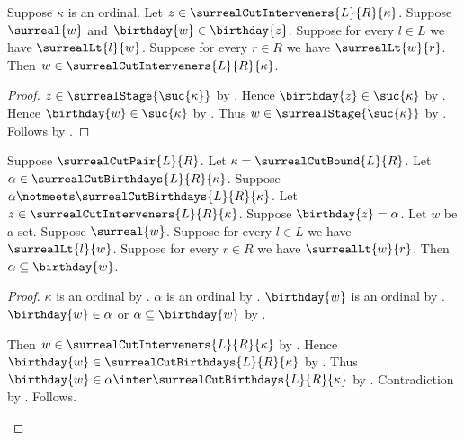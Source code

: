 \begin{lemma}\label{surreal_shorter_intervener_in_bound}
    Suppose $\kappa$ is an ordinal.
    Let $z\in\surrealCutInterveners{L}{R}{\kappa}$.
    Suppose $\surreal{w}$ and
        $\birthday{w}\in\birthday{z}$.
    Suppose for every $l\in L$ we have $\surrealLt{l}{w}$.
    Suppose for every $r\in R$ we have $\surrealLt{w}{r}$.
    Then $w\in\surrealCutInterveners{L}{R}{\kappa}$.
\end{lemma}
\begin{proof}
    $z\in\surrealStage{\suc{\kappa}}$
        by .
    Hence $\birthday{z}\in\suc{\kappa}$
        by .
    Hence $\birthday{w}\in\suc{\kappa}$
        by .
    Thus $w\in\surrealStage{\suc{\kappa}}$
        by .
    Follows by .
\end{proof}

\begin{lemma}\label{surreal_minimal_intervener_birthday}
    Suppose $\surrealCutPair{L}{R}$.
    Let $\kappa=\surrealCutBound{L}{R}$.
    Let $\alpha\in\surrealCutBirthdays{L}{R}{\kappa}$.
    Suppose $\alpha\notmeets\surrealCutBirthdays{L}{R}{\kappa}$.
    Let $z\in\surrealCutInterveners{L}{R}{\kappa}$.
    Suppose $\birthday{z}=\alpha$.
    Let $w$ be a set.
    Suppose $\surreal{w}$.
    Suppose for every $l\in L$ we have $\surrealLt{l}{w}$.
    Suppose for every $r\in R$ we have $\surrealLt{w}{r}$.
    Then $\alpha\subseteq\birthday{w}$.
\end{lemma}
\begin{proof}
    $\kappa$ is an ordinal by .
    $\alpha$ is an ordinal
        by .
    $\birthday{w}$ is an ordinal
        by .
    $\birthday{w}\in\alpha$ or
        $\alpha\subseteq\birthday{w}$
        by .
    \begin{byCase}
            Then $w\in\surrealCutInterveners{L}{R}{\kappa}$
                by .
            Hence $\birthday{w}\in\surrealCutBirthdays{L}{R}{\kappa}$
                by .
            Thus $\birthday{w}\in
                \alpha\inter\surrealCutBirthdays{L}{R}{\kappa}$
                by .
            Contradiction by .
            Follows.
    \end{byCase}
\end{proof}


